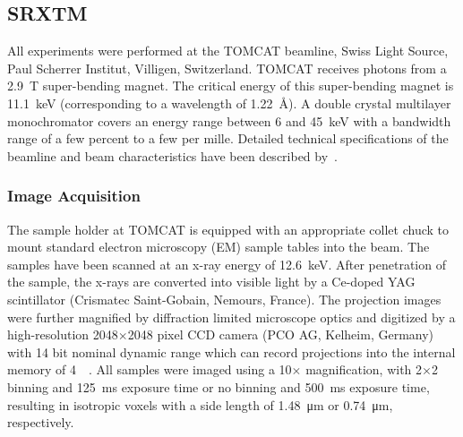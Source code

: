 \subsection{SRXTM}
All experiments were performed at the TOMCAT beamline, Swiss Light Source, Paul Scherrer Institut, Villigen, Switzerland. %
TOMCAT receives photons from a \SI{2.9}{\tesla} super-bending magnet. The critical energy of this super-bending magnet is \SI{11.1}{\kilo\electronvolt} (corresponding to a wavelength of \SI{1.22}{\angstrom}). A double crystal multilayer monochromator covers an energy range between 6 and \SI{45}{\kilo\electronvolt} with a bandwidth range of a few percent to a few per mille. Detailed technical specifications of the beamline and beam characteristics have been described by~\citet{Stampanoni2006a,Stampanoni2007}.

\subsubsection{Image Acquisition}
\label{seq:Image Acquisition}
The sample holder at TOMCAT is equipped with an appropriate collet chuck to mount standard electron microscopy (EM) sample tables into the beam. The samples have been scanned at an x-ray energy of \SI{12.6}{\kilo\electronvolt}. After penetration of the sample, the x-rays are converted into visible light by a Ce-doped YAG scintillator (Crismatec Saint-Gobain, Nemours, France). The projection images were further magnified by diffraction limited microscope optics and digitized by a high-resolution 2048\(\times\)2048 pixel CCD camera (PCO AG, Kelheim, Germany) with 14 bit nominal dynamic range which can record projections into the internal memory of \SI{4}{\giga\byte}. All samples were imaged using a 10\(\times\) magnification, with 2\(\times\)2 binning and \SI{125}{\milli\second} exposure time or no binning and \SI{500}{\milli\second} exposure time, resulting in isotropic voxels with a side length of \SI{1.48}{\micro\meter} or \SI{0.74}{\micro\meter}, respectively.


